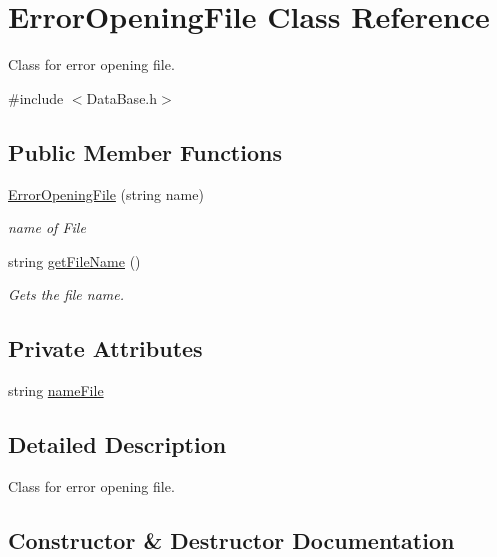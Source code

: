 \hypertarget{classErrorOpeningFile}{}\section{Error\+Opening\+File Class Reference}
\label{classErrorOpeningFile}


Class for error opening file.  




{\ttfamily \#include $<$Data\+Base.\+h$>$}

\subsection*{Public Member Functions}
\begin{DoxyCompactItemize}
\item 
\hyperlink{classErrorOpeningFile_a48508e7fc3c31fa2a4ea5489fde07411}{Error\+Opening\+File} (string name)
\begin{DoxyCompactList}\small\item\em name of File \end{DoxyCompactList}\item 
string \hyperlink{classErrorOpeningFile_a6177800f93b1e928ead4f55ef3421120}{get\+File\+Name} ()
\begin{DoxyCompactList}\small\item\em Gets the file name. \end{DoxyCompactList}\end{DoxyCompactItemize}
\subsection*{Private Attributes}
\begin{DoxyCompactItemize}
\item 
string \hyperlink{classErrorOpeningFile_a24d6690f6660667ef0532b68e3ee7ea9}{name\+File}
\end{DoxyCompactItemize}


\subsection{Detailed Description}
Class for error opening file. 

\subsection{Constructor \& Destructor Documentation}
\mbox{\label{classErrorOpeningFile_a48508e7fc3c31fa2a4ea5489fde07411}} 
